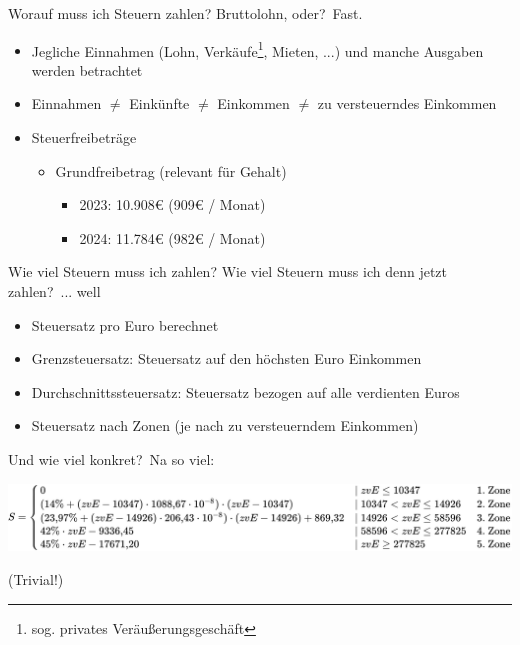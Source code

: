 \documentclass{beamer}
\begin{document}
			\begin{frame}{Worauf muss ich Steuern zahlen?}
				Bruttolohn, oder?\pause\ Fast.
				\pause
				\begin{itemize}
					\item Jegliche Einnahmen (Lohn, Verkäufe\footnote{sog. privates Veräußerungsgeschäft}, Mieten, ...) und manche Ausgaben werden betrachtet
					\item Einnahmen $\neq$ Einkünfte $\neq$ Einkommen $\neq$ zu versteuerndes Einkommen\pause
					\item Steuerfreibeträge
					\begin{itemize}
						\item Grundfreibetrag (relevant für Gehalt)
						\begin{itemize}
							\item 2023: 10.908€ (909€ / Monat)
							\item 2024: 11.784€ (982€ / Monat)
						\end{itemize}
					\end{itemize}
				\end{itemize}
			\end{frame}
			
			\begin{frame}{Wie viel Steuern muss ich zahlen?}
				Wie viel Steuern muss ich denn jetzt zahlen?\pause\ ... well\pause
				\begin{itemize}
					\item Steuersatz pro Euro berechnet\pause
					\item Grenzsteuersatz: Steuersatz auf den höchsten Euro Einkommen\pause
					\item Durchschnittssteuersatz: Steuersatz bezogen auf alle verdienten Euros\pause
					\item Steuersatz nach Zonen (je nach zu versteuerndem Einkommen)
				\end{itemize}
				\pause
				Und wie viel konkret?\pause\ Na so viel:\pause
				\begin{center}
					\includegraphics[width=\textwidth]{images/tarifzonen-formel}
				\end{center}
				\vspace*{-0.25cm}\pause
				{\tiny (Trivial!)}
				\vspace{0.55cm}
			\end{frame}
			
\end{document}
